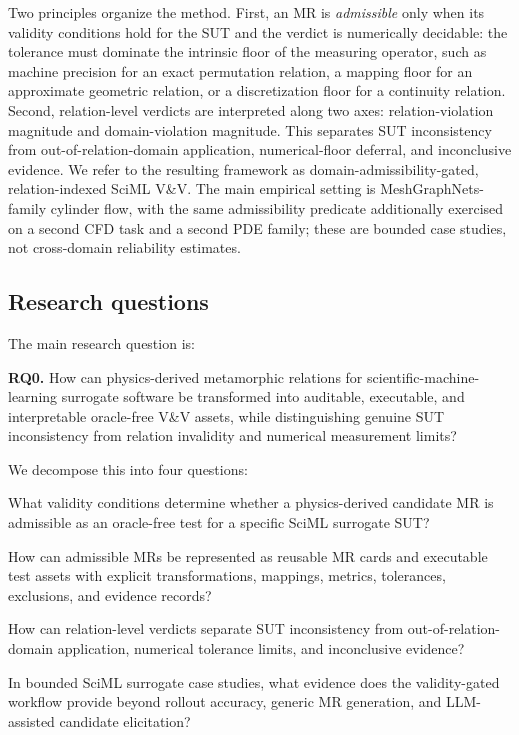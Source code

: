 \documentclass[preprint,12pt]{elsarticle}
\begin{document}
Two principles organize the method. First, an MR is \emph{admissible} only when its validity conditions hold for the SUT and the verdict is numerically decidable: the tolerance must dominate the intrinsic floor of the measuring operator, such as machine precision for an exact permutation relation, a mapping floor for an approximate geometric relation, or a discretization floor for a continuity relation. Second, relation-level verdicts are interpreted along two axes: relation-violation magnitude and domain-violation magnitude. This separates SUT inconsistency from out-of-relation-domain application, numerical-floor deferral, and inconclusive evidence. We refer to the resulting framework as domain-admissibility-gated, relation-indexed SciML V\&V. The main empirical setting is MeshGraphNets-family cylinder flow, with the same admissibility predicate additionally exercised on a second CFD task and a second PDE family; these are bounded case studies, not cross-domain reliability estimates.

\subsection{Research questions}
\label{subsec:rqs}

The main research question is:

\textbf{RQ0.} How can physics-derived metamorphic relations for scientific-machine-learning surrogate software be transformed into auditable, executable, and interpretable oracle-free V\&V assets, while distinguishing genuine SUT inconsistency from relation invalidity and numerical measurement limits?

We decompose this into four questions:
\begin{description}[leftmargin=!,labelwidth=2.4cm]
\item[RQ1 -- Admissibility.] What validity conditions determine whether a physics-derived candidate MR is admissible as an oracle-free test for a specific SciML surrogate SUT?
\item[RQ2 -- Asset construction.] How can admissible MRs be represented as reusable MR cards and executable test assets with explicit transformations, mappings, metrics, tolerances, exclusions, and evidence records?
\item[RQ3 -- Verdict interpretation.] How can relation-level verdicts separate SUT inconsistency from out-of-relation-domain application, numerical tolerance limits, and inconclusive evidence?
\item[RQ4 -- Empirical utility.] In bounded SciML surrogate case studies, what evidence does the validity-gated workflow provide beyond rollout accuracy, generic MR generation, and LLM-assisted candidate elicitation?
\end{description}
\end{document}
